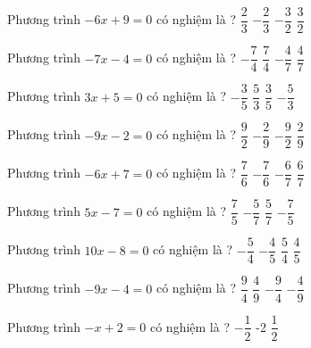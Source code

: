 \begin{ex} 
	Phương trình $-6x+9=0$ có nghiệm là ? 
	\choice
	{$ \dfrac{ 2 }{ 3 } $}
	{$- \dfrac{ 2 }{ 3 } $}
	{$- \dfrac{ 3 }{ 2 } $}
	{\True $ \dfrac{ 3 }{ 2 } $}
	\loigiai{} 
\end{ex}

\begin{ex} 
	Phương trình $-7x-4=0$ có nghiệm là ? 
	\choice
	{$- \dfrac{ 7 }{ 4 } $}
	{$ \dfrac{ 7 }{ 4 } $}
	{\True $- \dfrac{ 4 }{ 7 } $}
	{$ \dfrac{ 4 }{ 7 } $}
	\loigiai{} 
\end{ex}

\begin{ex} 
	Phương trình $3x+5=0$ có nghiệm là ? 
	\choice
	{$- \dfrac{ 3 }{ 5 } $}
	{$ \dfrac{ 5 }{ 3 } $}
	{$ \dfrac{ 3 }{ 5 } $}
	{\True $- \dfrac{ 5 }{ 3 } $}
	\loigiai{} 
\end{ex}

\begin{ex} 
	Phương trình $-9x-2=0$ có nghiệm là ? 
	\choice
	{$ \dfrac{ 9 }{ 2 } $}
	{\True $- \dfrac{ 2 }{ 9 } $}
	{$- \dfrac{ 9 }{ 2 } $}
	{$ \dfrac{ 2 }{ 9 } $}
	\loigiai{} 
\end{ex}

\begin{ex} 
	Phương trình $-6x+7=0$ có nghiệm là ? 
	\choice
	{\True $ \dfrac{ 7 }{ 6 } $}
	{$- \dfrac{ 7 }{ 6 } $}
	{$- \dfrac{ 6 }{ 7 } $}
	{$ \dfrac{ 6 }{ 7 } $}
	\loigiai{} 
\end{ex}

\begin{ex} 
	Phương trình $5x-7=0$ có nghiệm là ? 
	\choice
	{\True $ \dfrac{ 7 }{ 5 } $}
	{$- \dfrac{ 5 }{ 7 } $}
	{$ \dfrac{ 5 }{ 7 } $}
	{$- \dfrac{ 7 }{ 5 } $}
	\loigiai{} 
\end{ex}

\begin{ex} 
	Phương trình $10x-8=0$ có nghiệm là ? 
	\choice
	{$- \dfrac{ 5 }{ 4 } $}
	{$- \dfrac{ 4 }{ 5 } $}
	{$ \dfrac{ 5 }{ 4 } $}
	{\True $ \dfrac{ 4 }{ 5 } $}
	\loigiai{} 
\end{ex}

\begin{ex} 
	Phương trình $-9x-4=0$ có nghiệm là ? 
	\choice
	{$ \dfrac{ 9 }{ 4 } $}
	{$ \dfrac{ 4 }{ 9 } $}
	{$- \dfrac{ 9 }{ 4 } $}
	{\True $- \dfrac{ 4 }{ 9 } $}
	\loigiai{} 
\end{ex}

\begin{ex} 
	Phương trình $-x+2=0$ có nghiệm là ? 
	\choice
	{$- \dfrac{ 1 }{ 2 } $}
	{-2}
	{}
	{$ \dfrac{ 1 }{ 2 } $}
	\loigiai{} 
\end{ex}

